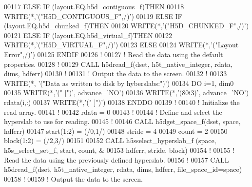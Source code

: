 \begin{DoxyCode}
00117   \textcolor{keywordflow}{ELSE} \textcolor{keywordflow}{IF} (layout.EQ.h5d\_contiguous\_f)\textcolor{keywordflow}{THEN}
00118      \textcolor{keyword}{WRITE}(*,\textcolor{stringliteral}{'("H5D\_CONTIGUOUS\_F",/)'})
00119   \textcolor{keywordflow}{ELSE} \textcolor{keywordflow}{IF} (layout.EQ.h5d\_chunked\_f)\textcolor{keywordflow}{THEN}
00120      \textcolor{keyword}{WRITE}(*,\textcolor{stringliteral}{'("H5D\_CHUNKED\_F",/)'})
00121   \textcolor{keywordflow}{ELSE} \textcolor{keywordflow}{IF} (layout.EQ.h5d\_virtual\_f)\textcolor{keywordflow}{THEN}
00122      \textcolor{keyword}{WRITE}(*,\textcolor{stringliteral}{'("H5D\_VIRTUAL\_F",/)'})
00123   \textcolor{keywordflow}{ELSE}
00124      \textcolor{keyword}{WRITE}(*,\textcolor{stringliteral}{'("Layout Error",/)'})
00125 \textcolor{keywordflow}{  ENDIF}
00126   \textcolor{comment}{!}
00127   \textcolor{comment}{! Read the data using the default properties.}
00128   \textcolor{comment}{!}
00129   \textcolor{keyword}{CALL }h5dread\_f(dset, h5t\_native\_integer, rdata, dims, hdferr)
00130   \textcolor{comment}{!}
00131   \textcolor{comment}{! Output the data to the screen.}
00132   \textcolor{comment}{!}
00133   \textcolor{keyword}{WRITE}(*, \textcolor{stringliteral}{'("Data as written to disk by hyberslabs:")'})
00134   \textcolor{keywordflow}{DO} i=1, dim0
00135      \textcolor{keyword}{WRITE}(*,\textcolor{stringliteral}{'(" [")'}, advance=\textcolor{stringliteral}{'NO'})
00136      \textcolor{keyword}{WRITE}(*,\textcolor{stringliteral}{'(80i3)'}, advance=\textcolor{stringliteral}{'NO'}) rdata(i,:)
00137      \textcolor{keyword}{WRITE}(*,\textcolor{stringliteral}{'(" ]")'})
00138 \textcolor{keywordflow}{  ENDDO}
00139   \textcolor{comment}{!}
00140   \textcolor{comment}{! Initialize the read array.}
00141   \textcolor{comment}{!}
00142   rdata = 0
00143   \textcolor{comment}{!}
00144   \textcolor{comment}{! Define and select the hyperslab to use for reading.}
00145   \textcolor{comment}{!}
00146   \textcolor{keyword}{CALL }h5dget\_space\_f(dset, space, hdferr)
00147   start(1:2) = (/0,1/)
00148   stride = 4
00149   count = 2
00150   block(1:2) = (/2,3/)
00151 
00152   \textcolor{keyword}{CALL }h5sselect\_hyperslab\_f (space, h5s\_select\_set\_f, start, count, &
00153        hdferr, stride, block)
00154   \textcolor{comment}{!}
00155   \textcolor{comment}{! Read the data using the previously defined hyperslab.}
00156   \textcolor{comment}{!}
00157   \textcolor{keyword}{CALL }h5dread\_f(dset, h5t\_native\_integer, rdata, dims, hdferr, file\_space\_id=space)
00158   \textcolor{comment}{!}
00159   \textcolor{comment}{! Output the data to the screen.}

\end{DoxyCode}
